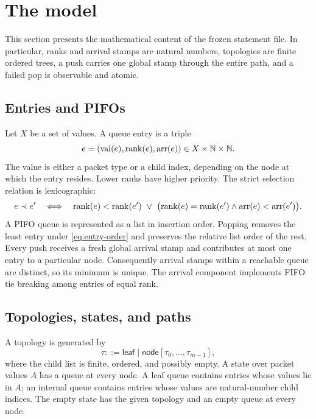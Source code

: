 \section{The model}
\label{sec:model}

This section presents the mathematical content of the frozen statement file.
In particular, ranks and arrival stamps are natural numbers, topologies are
finite ordered trees, a push carries one global stamp through the entire path,
and a failed pop is observable and atomic.

\subsection{Entries and PIFOs}

Let \(X\) be a set of values.  A queue entry is a triple
\[
  e=(\operatorname{val}(e),\operatorname{rank}(e),\operatorname{arr}(e))\in X\times\mathbb{N}\times\mathbb{N}.
\]
The value is either a packet type or a child index, depending on the node at
which the entry resides.  Lower ranks have higher priority.  The strict
selection relation is lexicographic:
\begin{equation}
 e\mathrel{\prec}e'
 \quad\Longleftrightarrow\quad
 \rank(e)<\rank(e')
 \ \lor\ 
 \bigl(\rank(e)=\rank(e')\land\arr(e)<\arr(e')\bigr).
 \label{eq:entry-order}
\end{equation}
A PIFO queue is represented as a list in insertion order.  Popping removes the
least entry under \autoref{eq:entry-order} and preserves the relative list order
of the rest.  Every push receives a fresh global arrival stamp and contributes
at most one entry to a particular node.  Consequently arrival stamps within a
reachable queue are distinct, so its minimum is unique.  The arrival component
implements FIFO tie breaking among entries of equal rank.

\subsection{Topologies, states, and paths}

A topology is generated by
\[
  \tau ::= \mathsf{leaf}
      \mid \mathsf{node}[\tau_0,\ldots,\tau_{m-1}],
\]
where the child list is finite, ordered, and possibly empty.  A state over
packet values \(A\) has a queue at every node.  A leaf queue contains entries
whose values lie in \(A\); an internal queue contains entries whose values are
natural-number child indices.  The empty state has the given topology and an
empty queue at every node.

